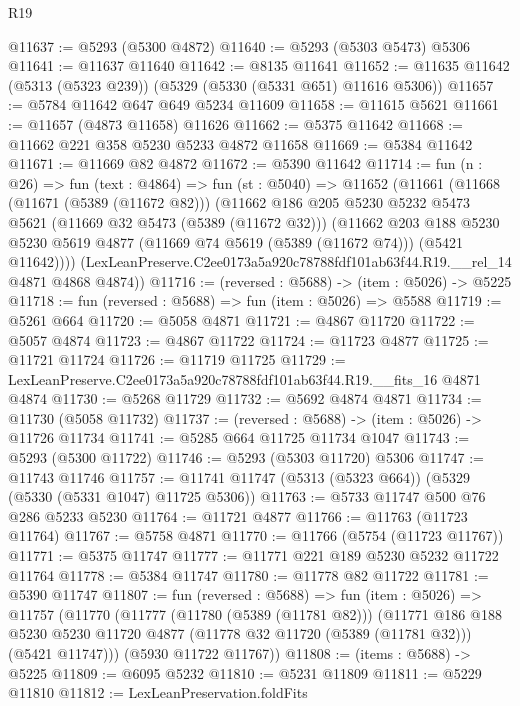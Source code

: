 \begin{lexlean}{R19}
\begin{coremodule}
@11637 := @5293 (@5300 @4872)
@11640 := @5293 (@5303 @5473) @5306
@11641 := @11637 @11640
@11642 := @8135 @11641
@11652 := @11635 @11642 (@5313 (@5323 @239)) (@5329 (@5330 (@5331 @651) @11616 @5306))
@11657 := @5784 @11642 @647 @649 @5234 @11609
@11658 := @11615 @5621
@11661 := @11657 (@4873 @11658) @11626
@11662 := @5375 @11642
@11668 := @11662 @221 @358 @5230 @5233 @4872 @11658
@11669 := @5384 @11642
@11671 := @11669 @82 @4872
@11672 := @5390 @11642
@11714 := fun (n : @26) =>
  fun (text : @4864) =>
  fun (st : @5040) =>
  @11652
    (@11661
      (@11668
        (@11671 (@5389 (@11672 @82)))
        (@11662
          @186
          @205
          @5230
          @5232
          @5473
          @5621
          (@11669 @32 @5473 (@5389 (@11672 @32)))
          (@11662
            @203
            @188
            @5230
            @5230
            @5619
            @4877
            (@11669 @74 @5619 (@5389 (@11672 @74)))
            (@5421 @11642))))
      (LexLeanPreserve.C2ee0173a5a920c78788fdf101ab63f44.R19.__rel_14 @4871 @4868 @4874))
@11716 := (reversed : @5688) -> (item : @5026) -> @5225
@11718 := fun (reversed : @5688) => fun (item : @5026) => @5588
@11719 := @5261 @664
@11720 := @5058 @4871
@11721 := @4867 @11720
@11722 := @5057 @4874
@11723 := @4867 @11722
@11724 := @11723 @4877
@11725 := @11721 @11724
@11726 := @11719 @11725
@11729 := LexLeanPreserve.C2ee0173a5a920c78788fdf101ab63f44.R19.__fits_16 @4871 @4874
@11730 := @5268 @11729
@11732 := @5692 @4874 @4871
@11734 := @11730 (@5058 @11732)
@11737 := (reversed : @5688) -> (item : @5026) -> @11726 @11734
@11741 := @5285 @664 @11725 @11734 @1047
@11743 := @5293 (@5300 @11722)
@11746 := @5293 (@5303 @11720) @5306
@11747 := @11743 @11746
@11757 := @11741 @11747 (@5313 (@5323 @664)) (@5329 (@5330 (@5331 @1047) @11725 @5306))
@11763 := @5733 @11747 @500 @76 @286 @5233 @5230
@11764 := @11721 @4877
@11766 := @11763 (@11723 @11764)
@11767 := @5758 @4871
@11770 := @11766 (@5754 (@11723 @11767))
@11771 := @5375 @11747
@11777 := @11771 @221 @189 @5230 @5232 @11722 @11764
@11778 := @5384 @11747
@11780 := @11778 @82 @11722
@11781 := @5390 @11747
@11807 := fun (reversed : @5688) =>
  fun (item : @5026) =>
  @11757
    (@11770
      (@11777
        (@11780 (@5389 (@11781 @82)))
        (@11771
          @186
          @188
          @5230
          @5230
          @11720
          @4877
          (@11778 @32 @11720 (@5389 (@11781 @32)))
          (@5421 @11747)))
      (@5930 @11722 @11767))
@11808 := (items : @5688) -> @5225
@11809 := @6095 @5232
@11810 := @5231 @11809
@11811 := @5229 @11810
@11812 := LexLeanPreservation.foldFits

\end{coremodule}
\end{lexlean}
